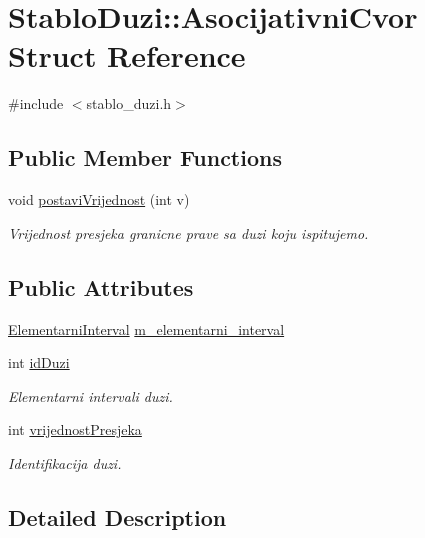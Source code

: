\hypertarget{struct_stablo_duzi_1_1_asocijativni_cvor}{\section{Stablo\-Duzi\-:\-:Asocijativni\-Cvor Struct Reference}
\label{struct_stablo_duzi_1_1_asocijativni_cvor}
}


{\ttfamily \#include $<$stablo\-\_\-duzi.\-h$>$}

\subsection*{Public Member Functions}
\begin{DoxyCompactItemize}
\item 
void \hyperlink{struct_stablo_duzi_1_1_asocijativni_cvor_a5b030166d0f1b297df96d74b76e818d8}{postavi\-Vrijednost} (int v)
\begin{DoxyCompactList}\small\item\em Vrijednost presjeka granicne prave sa duzi koju ispitujemo. \end{DoxyCompactList}\end{DoxyCompactItemize}
\subsection*{Public Attributes}
\begin{DoxyCompactItemize}
\item 
\hyperlink{struct_elementarni_interval}{Elementarni\-Interval} \hyperlink{struct_stablo_duzi_1_1_asocijativni_cvor_a2e5d08a307d13771e0316aaa3ecabcc6}{m\-\_\-elementarni\-\_\-interval}
\item 
int \hyperlink{struct_stablo_duzi_1_1_asocijativni_cvor_a5f82ba43e3eae6db009a70992369a224}{id\-Duzi}
\begin{DoxyCompactList}\small\item\em Elementarni intervali duzi. \end{DoxyCompactList}\item 
int \hyperlink{struct_stablo_duzi_1_1_asocijativni_cvor_a47a041893c15e7cafd55d1df1c63c51d}{vrijednost\-Presjeka}
\begin{DoxyCompactList}\small\item\em Identifikacija duzi. \end{DoxyCompactList}\end{DoxyCompactItemize}


\subsection{Detailed Description}


